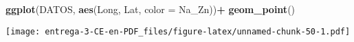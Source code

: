 \documentclass[
]{article}
\newenvironment{Shaded}{\begin{snugshade}}{\end{snugshade}}
\newcommand{\DataTypeTok}[1]{\textcolor[rgb]{0.13,0.29,0.53}{#1}}
\newcommand{\DecValTok}[1]{\textcolor[rgb]{0.00,0.00,0.81}{#1}}
\newcommand{\KeywordTok}[1]{\textcolor[rgb]{0.13,0.29,0.53}{\textbf{#1}}}
\newcommand{\NormalTok}[1]{#1}
\newcommand{\OperatorTok}[1]{\textcolor[rgb]{0.81,0.36,0.00}{\textbf{#1}}}
\newcommand{\StringTok}[1]{\textcolor[rgb]{0.31,0.60,0.02}{#1}}
\begin{document}
\begin{Shaded}
\begin{Highlighting}[]
\KeywordTok{ggplot}\NormalTok{(DATOS, }\KeywordTok{aes}\NormalTok{(Long, Lat, }\DataTypeTok{color =}\NormalTok{ Na_Zn))}\OperatorTok{+}
\StringTok{  }\KeywordTok{geom_point}\NormalTok{()}
\end{Highlighting}
\end{Shaded}

\texttt{[image: entrega-3-CE-en-PDF\_files/figure-latex/unnamed-chunk-50-1.pdf]}

\begin{Shaded}
\end{Shaded}
\end{document}
